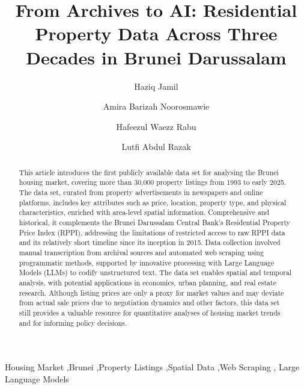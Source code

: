\documentclass[
  number]{elsarticle}
\begin{document}
\begin{frontmatter}
\title{From Archives to AI: Residential Property Data Across Three
Decades in Brunei Darussalam}
\author[1]{Haziq Jamil%
%
}
\author[1]{Amira Barizah Noorosmawie%
%
}

\author[1]{Hafeezul Waezz Rabu%
%
}

\author[2]{Lutfi Abdul Razak%
%
}






        
\begin{abstract}
This article introduces the first publicly available data set for
analysing the Brunei housing market, covering more than 30,000 property
listings from 1993 to early 2025. The data set, curated from property
advertisements in newspapers and online platforms, includes key
attributes such as price, location, property type, and physical
characteristics, enriched with area-level spatial information.
Comprehensive and historical, it complements the Brunei Darussalam
Central Bank's Residential Property Price Index (RPPI), addressing the
limitations of restricted access to raw RPPI data and its relatively
short timeline since its inception in 2015. Data collection involved
manual transcription from archival sources and automated web scraping
using programmatic methods, supported by innovative processing with
Large Language Models (LLMs) to codify unstructured text. The data set
enables spatial and temporal analysis, with potential applications in
economics, urban planning, and real estate research. Although listing
prices are only a proxy for market values and may deviate from actual
sale prices due to negotiation dynamics and other factors, this data set
still provides a valuable resource for quantitative analyses of housing
market trends and for informing policy decisions.
\end{abstract}





\begin{keyword}
    Housing Market \sep Brunei \sep Property Listings \sep Spatial
Data \sep Web Scraping \sep 
    Large Language Models
\end{keyword}
\end{frontmatter}
    
\end{document}
